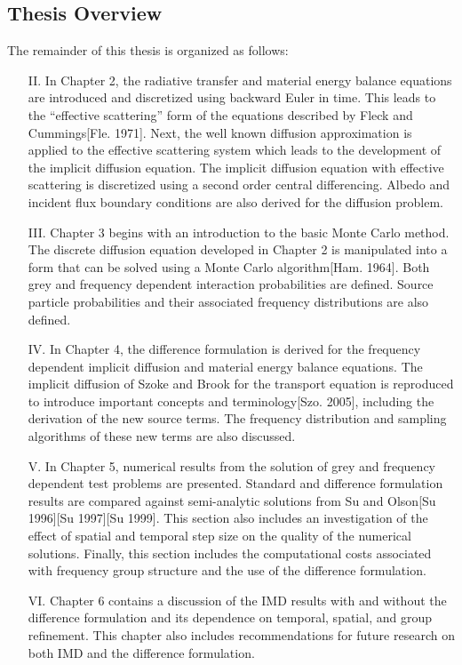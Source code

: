 \subsection{Thesis Overview}
\label{sec:Intro-Overview}

\noindent
	\indent The remainder of this thesis is organized as follows:
	
	\begin{enumerate}
		\item[II{.}]  In Chapter 2, the radiative transfer and material energy balance equations are introduced and discretized using backward Euler in time. This leads to the ``effective scattering'' form of the equations described by Fleck and Cummings[Fle. 1971]. Next, the well known diffusion approximation is applied to the effective scattering system which leads to the development of the implicit diffusion equation. The implicit diffusion equation with effective scattering is discretized using a second order central differencing. Albedo and incident flux boundary conditions are also derived for the diffusion problem.

		\item[III{.}] Chapter 3 begins with an introduction to the basic Monte Carlo method. The discrete diffusion equation developed in Chapter 2 is manipulated into a form that can be solved using a Monte Carlo algorithm[Ham. 1964]. Both grey and frequency dependent interaction probabilities are defined. Source particle probabilities and their associated frequency distributions are also defined.

		\item[IV{.}] In Chapter 4, the difference formulation is derived for the frequency dependent implicit diffusion and material energy balance equations. The implicit diffusion of Szoke and Brook for the transport equation is reproduced to introduce important concepts and terminology[Szo. 2005], including the derivation of the new source terms. The frequency distribution and sampling algorithms of these new terms are also discussed.

		\item[V{.}] In Chapter 5, numerical results from the solution of grey and frequency dependent test problems are presented. Standard and difference formulation results are compared against semi-analytic solutions from Su and Olson[Su 1996][Su 1997][Su 1999]. This section also includes an investigation of the effect of spatial and temporal step size on the quality of the numerical solutions. Finally, this section includes the computational costs associated with frequency group structure and the use of the difference formulation.

		\item[VI{.}] Chapter 6 contains a discussion of the IMD results with and without the difference formulation and its dependence on temporal, spatial, and group refinement. This chapter also includes recommendations for future research on both IMD and the difference formulation.

	\end{enumerate}

